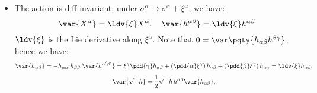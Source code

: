 \documentclass[a4paper,10pt]{article}
\begin{document}
	\begin{itemize}
	\item The action is diff-invariant; under $
		\sigma^\alpha
		\mapsto \sigma^\alpha + \xi^\alpha
	$, we have:
	\begin{equation}
		\var{X^\alpha}
		= \ldv{\xi} X^\alpha,\quad
		\var{h^{\alpha\beta}}
		= \ldv{\xi} h^{\alpha\beta}
	\end{equation}
	$\ldv{\xi}$ is the Lie derivative along $\xi^\alpha$. Note that $
		0 = \var\pqty{
			h_{\alpha\beta} h^{\beta\gamma}
		}
	$, hence we have:
	\begin{gather}
		\var{h_{\alpha\beta}}
		= -h_{\alpha\alpha'} h_{\beta\beta'}
			\var{h^{\alpha'\beta'}}
		= \xi^\gamma \pdd{\gamma} h_{\alpha\beta}
			+ (\pdd{\alpha} \xi^\gamma)\,
				h_{\gamma\beta}
			+ (\pdd{\beta} \xi^\gamma)\,
				h_{\alpha\gamma}
		= \ldv{\xi} h_{\alpha\beta},\\[1ex]
		\var{\sqrt{-h}}
		= \frac{1}{2} \sqrt{-h}\,
			h^{\alpha\beta} \var{h_{\alpha\beta}},
	\end{gather}
	

\end{itemize}
\end{document}
